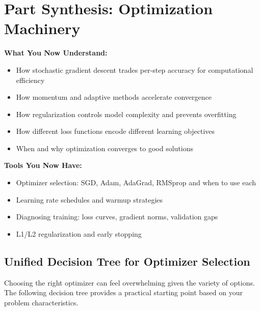 \documentclass[../../editions/book2-optimization/main.tex]{subfiles}
\begin{document}
\chapter*{Part Synthesis: Optimization Machinery}

\begin{keyconcept}
\textbf{What You Now Understand:}
\begin{itemize}
    \item How stochastic gradient descent trades per-step accuracy for computational efficiency
    \item How momentum and adaptive methods accelerate convergence
    \item How regularization controls model complexity and prevents overfitting
    \item How different loss functions encode different learning objectives
    \item When and why optimization converges to good solutions
\end{itemize}
\end{keyconcept}

\begin{keyconcept}
\textbf{Tools You Now Have:}
\begin{itemize}
    \item Optimizer selection: SGD, Adam, AdaGrad, RMSprop and when to use each
    \item Learning rate schedules and warmup strategies
    \item Diagnosing training: loss curves, gradient norms, validation gaps
    \item L1/L2 regularization and early stopping
\end{itemize}
\end{keyconcept}

\section*{Unified Decision Tree for Optimizer Selection}

Choosing the right optimizer can feel overwhelming given the variety of options. The following decision tree provides a practical starting point based on your problem characteristics.
\end{document}
